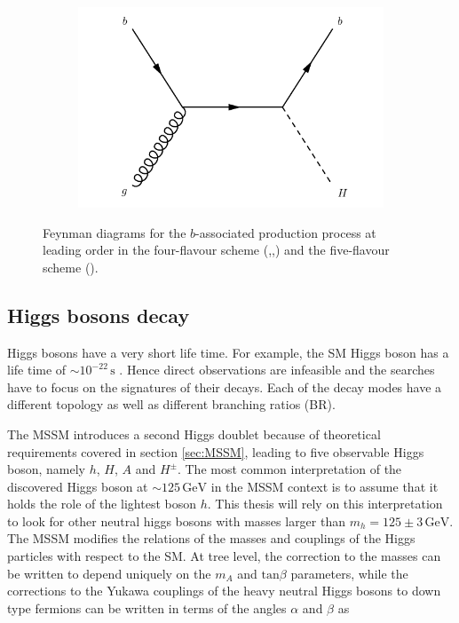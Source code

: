 \begin{figure}
\begin{subfigure}[b]{0.22\textwidth}
  \caption{\label{fig:bbh3}}
\end{subfigure}
\begin{subfigure}[b]{0.22\textwidth}
  \centering
  \includegraphics[width=\textwidth]{Images/bbh4.pdf}
  \caption{\label{fig:bbh4}}
\end{subfigure}%
\caption{Feynman diagrams for the $b$-associated production process at leading order in the four-flavour scheme (,,) and the five-flavour scheme ().}
\label{fig:bbh}
\end{figure}

\subsection{Higgs bosons decay}

Higgs bosons have a very short life time. For example, the SM Higgs boson has a life time of $\sim 10^{-22} \, \mathrm{s}$ \cite{pdg2016}. Hence direct observations are infeasible and the searches have to focus on the signatures of their decays. Each of the decay modes have a different topology as well as different branching ratios (BR). 

The MSSM introduces a second Higgs doublet because of theoretical requirements covered in section \ref{sec:MSSM}, leading to five observable Higgs boson, namely $h$, $H$, $A$ and $H^{\pm}$. The most common interpretation of the discovered Higgs boson at $\sim 125\, \mathrm{GeV}$ in the MSSM context is to assume that it holds the role of the lightest boson $h$. This thesis will rely on this interpretation to look for other neutral higgs bosons with masses larger than $m_h = 125 \pm 3 \, \mathrm{GeV}$. The MSSM modifies the relations of the masses and couplings of the Higgs particles with respect to the SM. At tree level, the correction to the masses can be written to depend uniquely on the $m_A$ and $\mathrm{tan} \beta$ parameters, while the corrections to the Yukawa couplings of the heavy neutral Higgs bosons to down type fermions can be written in terms of the angles $\alpha$ and $\beta$ as

